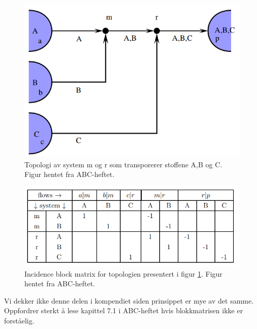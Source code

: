 \begin{figure}[H]
    \centering
    \includegraphics[scale=0.7]{Figures/Block_matrix_topo}
    \caption{Topologi av system m og r som transporerer stoffene A,B og C. Figur hentet fra ABC-heftet.}
    \label{fig:block_matrix1}
\end{figure}

\begin{figure}[H]
    \centering
    \includegraphics[scale=0.7]{Figures/Block_matrix}
    \caption{Incidence block matrix for topologien presentert i figur \cref{fig:block_matrix1}. Figur hentet fra ABC-heftet.}
    \label{fig:block_marix}
\end{figure}
Vi dekker ikke denne delen i kompendiet siden prinsippet er mye av det samme. Oppfordrer sterkt å lese kapittel 7.1 i ABC-heftet hvis blokkmatrisen ikke er forståelig.
